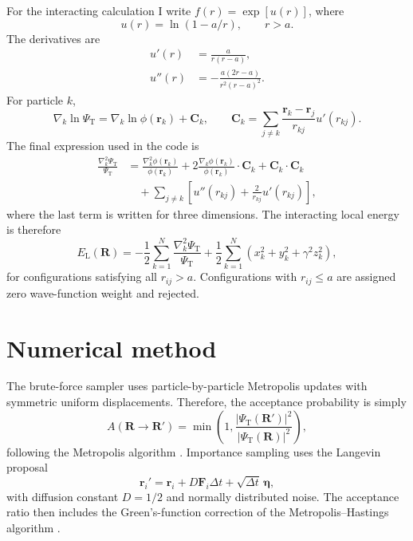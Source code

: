 \documentclass[10pt,a4paper]{article}
\newcommand{\br}{\mathbf{r}}
\newcommand{\bR}{\mathbf{R}}
\newcommand{\EL}{E_{\mathrm{L}}}
\newcommand{\PsiT}{\Psi_{\mathrm{T}}}
\newcommand{\dt}{\Delta t}
\begin{document}
For the interacting calculation I write $f(r)=\exp[u(r)]$, where
\begin{equation}
    u(r)=\ln(1-a/r),\qquad r>a.
\end{equation}
The derivatives are
\begin{align}
    u'(r)&=\frac{a}{r(r-a)},\label{eq:uprime}\\
    u''(r)&=-\frac{a(2r-a)}{r^2(r-a)^2}.\label{eq:usecond}
\end{align}
For particle $k$,
\begin{equation}
    \nabla_k\ln\PsiT=\nabla_k\ln\phi(\br_k)+\mathbf{C}_k,
    \qquad
    \mathbf{C}_k=\sum_{j\ne k}\frac{\br_k-\br_j}{r_{kj}}u'(r_{kj}).
    \label{eq:grad-log-full}
\end{equation}
The final expression used in the code is
\begin{align}
    \frac{\nabla_k^2\PsiT}{\PsiT}
    &= \frac{\nabla_k^2\phi(\br_k)}{\phi(\br_k)}
    +2\frac{\nabla_k\phi(\br_k)}{\phi(\br_k)}\cdot\mathbf{C}_k
    +\mathbf{C}_k\cdot\mathbf{C}_k \\
    &\quad +\sum_{j\ne k}\left[u''(r_{kj})+\frac{2}{r_{kj}}u'(r_{kj})\right],
    \label{eq:full-laplacian-final}
\end{align}
where the last term is written for three dimensions. The interacting local energy is therefore
\begin{equation}
    \EL(\bR)=
    -\frac{1}{2}\sum_{k=1}^{N}\frac{\nabla_k^2\PsiT}{\PsiT}
    +\frac{1}{2}\sum_{k=1}^{N}(x_k^2+y_k^2+\gamma^2z_k^2),
    \label{eq:full-interacting-local-energy}
\end{equation}
for configurations satisfying all $r_{ij}>a$. Configurations with $r_{ij}\le a$ are assigned zero wave-function weight and rejected.

\section{Numerical method}\label{sec:method}

The brute-force sampler uses particle-by-particle Metropolis updates with symmetric uniform displacements. Therefore, the acceptance probability is simply
\begin{equation}
    A(\bR\rightarrow\bR')=\min\left(1,\frac{|\PsiT(\bR')|^2}{|\PsiT(\bR)|^2}\right),
    \label{eq:bruteforce-acceptance}
\end{equation}
following the Metropolis algorithm \cite{metropolis1953}. Importance sampling uses the Langevin proposal
\begin{equation}
    \br_i'=\br_i+D\mathbf{F}_i\dt+\sqrt{\dt}\,\bm{\eta},
    \label{eq:langevin-proposal}
\end{equation}
with diffusion constant $D=1/2$ and normally distributed noise. The acceptance ratio then includes the Green's-function correction of the Metropolis--Hastings algorithm \cite{hastings1970}.
\end{document}
